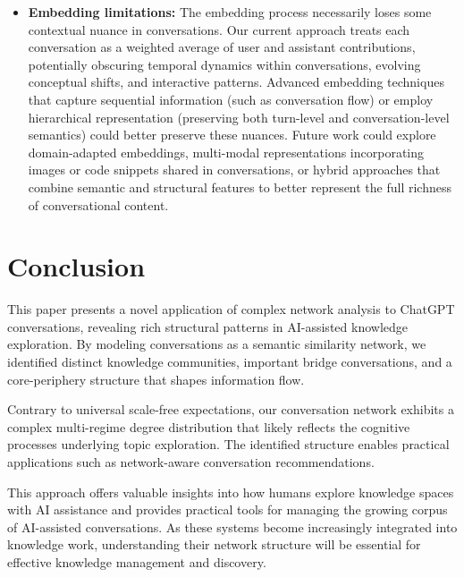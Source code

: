 \documentclass[10pt, a4paper]{article}
\begin{document}
\begin{itemize}
    \item \textbf{Embedding limitations:} The embedding process necessarily loses some contextual nuance in conversations. Our current approach treats each conversation as a weighted average of user and assistant contributions, potentially obscuring temporal dynamics within conversations, evolving conceptual shifts, and interactive patterns. Advanced embedding techniques that capture sequential information (such as conversation flow) or employ hierarchical representation (preserving both turn-level and conversation-level semantics) could better preserve these nuances. Future work could explore domain-adapted embeddings, multi-modal representations incorporating images or code snippets shared in conversations, or hybrid approaches that combine semantic and structural features to better represent the full richness of conversational content.
\end{itemize}

\section{Conclusion}

This paper presents a novel application of complex network analysis to ChatGPT conversations, revealing rich structural patterns in AI-assisted knowledge exploration. By modeling conversations as a semantic similarity network, we identified distinct knowledge communities, important bridge conversations, and a core-periphery structure that shapes information flow.

Contrary to universal scale-free expectations, our conversation network exhibits a complex multi-regime degree distribution that likely reflects the cognitive processes underlying topic exploration. The identified structure enables practical applications such as network-aware conversation recommendations.

This approach offers valuable insights into how humans explore knowledge spaces with AI assistance and provides practical tools for managing the growing corpus of AI-assisted conversations. As these systems become increasingly integrated into knowledge work, understanding their network structure will be essential for effective knowledge management and discovery.
\end{document}
